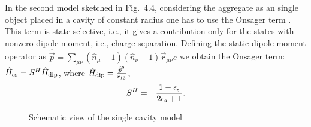\documentclass[12pt,twoside,a4paper]{report}
\begin{document}


In the second model sketched in Fig.~4.4,
considering the aggregate as an single object 
placed in a cavity  of constant radius 
one has to use the Onsager term \cite{Karelson}.
This term
is state selective, i.e., it gives a contribution only for the states
with nonzero dipole moment, i.e., charge separation.  Defining the
static dipole moment operator as
$\hat{\vec{p}}=\sum\limits_{\mu{}\nu}(\hat n_\mu{}-1)(\hat
n_\nu-1)\vec r_{\mu{}\nu}e$ we obtain the Onsager term:
$
\hat H
_{\rm es}
           =   
                S^H \hat H_{\rm dip}$, 
where
$\hat H
_{\rm dip}
           =
                \frac{\hat{\vec{p}}^2}
                     {r_{13}}$,
\begin{eqnarray}
S^H      
          &=&
                \frac{1-\epsilon_{\rm s}}
                     {2\epsilon_{\rm s}+1}. 
\label{Onsager-scaling}
\end{eqnarray}


\footnotesize\begin{figure}[!h]\centering
  \parbox{7.3cm}
  {\rule{0cm}{0cm}
\epsfxsize=5cm
}
\label{single-fig}
\caption[Schematic view of the 
single cavity model]
{\small Schematic view of the 
single cavity model
}
\end{figure}\normalsize
\end{document}
